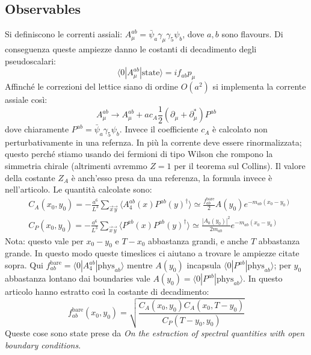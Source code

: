 \documentclass[12pt,a4paper,openright]{article}
\newcommand{\la}{\langle}
\newcommand{\ra}{\rangle}
\begin{document}
\subsection{Observables}
Si definiscono le correnti assiali: $A_\mu^{ab} = \bar \psi_a \gamma_\mu \gamma_5 \psi_b$, dove $a,b$ sono flavours. Di conseguenza queste ampiezze danno le costanti di decadimento degli pseudoscalari:
\begin{equation*}
  \la 0 | A_\mu^{ab} | \text{state} \ra = i f_{ab}p_\mu 
\end{equation*}
Affinché le correzioni del lettice siano di ordine $O(a^2)$ si implementa la corrente assiale così:
\begin{equation*}
  A_\mu^{ab} \rightarrow A_\mu^{ab} + ac_A \frac{1}{2}\left(\partial_\mu + \partial_\mu^*\right) P^{ab}
\end{equation*}
dove chiaramente $P^{ab} = \bar \psi_a \gamma_5 \psi_b$. Invece il coefficiente $c_A$ è calcolato non perturbativamente in una refernza.
\newline
In più la corrente deve essere rinormalizzata; questo perché stiamo usando dei fermioni di tipo Wilson che rompono la simmetria chirale (altrimenti avremmo $Z=1$ per il teorema sul Collins).
Il valore della costante $Z_A$ è anch'esso presa da una referenza, la formula invece è nell'articolo.
\newline
Le quantità calcolate sono:
\begin{equation*}
  \begin{aligned}
    & C_A(x_0,y_0) = -\frac{a^6}{L^3} \sum_{\vec x \vec y} \la A_4^{ab}(x) P^{ab}(y)^\dagger \ra \simeq \frac{f_{ab}^{\text{bare}}}{2}A(y_0)e^{-m_{ab}(x_0-y_0)} \\
    & C_P(x_0,y_0) = -\frac{a^6}{L^3} \sum_{\vec x \vec y} \la P^{ab}(x) P^{ab}(y)^\dagger \ra \simeq \frac{|A_0(y_0)|^2}{2m_{ab}}e^{-m_{ab}(x_0-y_0)}
  \end{aligned}
\end{equation*}
Nota: questo vale per $x_0-y_0$ e $T-x_0$ abbastanza grandi, e anche $T$ abbastanza grande. In questo modo queste timeslices ci aiutano a trovare le ampiezze citate sopra.
Qui $f_{ab}^{\text{bare}} = \la 0 | A_4^{ab} | \text{phys}_{ab} \ra$ mentre $A(y_0)$ incapsula $\la 0 | P^{ab} | \text{phys}_{ab} \ra$;
per $y_0$ abbastanza lontano dai boundaries vale $A(y_0) = \la 0 | P^{ab} | \text{phys}_{ab} \ra$.
\newline
In questo articolo hanno estratto così la costante di decadimento:
\begin{equation*}
  f^{\text{bare}}_{ab}(x_0,y_0) = \sqrt{\frac{C_A(x_0,y_0)C_A(x_0,T-y_0)}{C_P(T-y_0,y_0)}}
\end{equation*}
Queste cose sono state prese da \textit{On the estraction of spectral quantities with open boundary conditions}.
\end{document}
